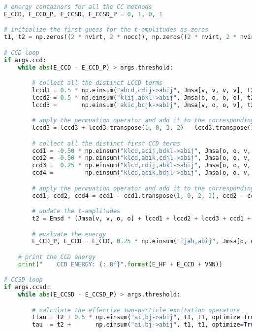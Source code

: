 \raggedbottom\begin{lstlisting}[language=Python, caption={\acrshort{ccd} and \acrshort{ccsd} method exercise code solution.}, label=code:cc_solution]
# energy containers for all the CC methods
E_CCD, E_CCD_P, E_CCSD, E_CCSD_P = 0, 1, 0, 1

# initialize the first guess for the t-amplitudes as zeros
t1, t2 = np.zeros((2 * nvirt, 2 * nocc)), np.zeros((2 * nvirt, 2 * nvirt, 2 * nocc, 2 * nocc))

# CCD loop
if args.ccd:
    while abs(E_CCD - E_CCD_P) > args.threshold:

        # collect all the distinct LCCD terms
        lccd1 = 0.5 * np.einsum("abcd,cdij->abij", Jmsa[v, v, v, v], t2, optimize=True)
        lccd2 = 0.5 * np.einsum("klij,abkl->abij", Jmsa[o, o, o, o], t2, optimize=True)
        lccd3 =       np.einsum("akic,bcjk->abij", Jmsa[v, o, o, v], t2, optimize=True)

        # apply the permuation operator and add it to the corresponding LCCD terms
        lccd3 = lccd3 + lccd3.transpose(1, 0, 3, 2) - lccd3.transpose(1, 0, 2, 3) - lccd3.transpose(0, 1, 3, 2)

        # collect all the distinct first CCD terms
        ccd1 = -0.50 * np.einsum("klcd,acij,bdkl->abij", Jmsa[o, o, v, v], t2, t2, optimize=True)
        ccd2 = -0.50 * np.einsum("klcd,abik,cdjl->abij", Jmsa[o, o, v, v], t2, t2, optimize=True)
        ccd3 =  0.25 * np.einsum("klcd,cdij,abkl->abij", Jmsa[o, o, v, v], t2, t2, optimize=True)
        ccd4 =         np.einsum("klcd,acik,bdjl->abij", Jmsa[o, o, v, v], t2, t2, optimize=True)

        # apply the permuation operator and add it to the corresponding CCD terms
        ccd1, ccd2, ccd4 = ccd1 - ccd1.transpose(1, 0, 2, 3), ccd2 - ccd2.transpose(0, 1, 3, 2), ccd4 - ccd4.transpose(0, 1, 3, 2)

        # update the t-amplitudes
        t2 = Emsd * (Jmsa[v, v, o, o] + lccd1 + lccd2 + lccd3 + ccd1 + ccd2 + ccd3 + ccd4)

        # evaluate the energy
        E_CCD_P, E_CCD = E_CCD, 0.25 * np.einsum("ijab,abij", Jmsa[o, o, v, v], t2, optimize=True)

    # print the CCD energy
    print("    CCD ENERGY: {:.8f}".format(E_HF + E_CCD + VNN))

# CCSD loop
if args.ccsd:
    while abs(E_CCSD - E_CCSD_P) > args.threshold:

        # calculate the effective two-particle excitation operators
        ttau = t2 + 0.5 * np.einsum("ai,bj->abij", t1, t1, optimize=True) - 0.5 * np.einsum("ai,bj->abij", t1, t1, optimize=True).swapaxes(2, 3)
        tau  = t2 +       np.einsum("ai,bj->abij", t1, t1, optimize=True) -       np.einsum("ai,bj->abij", t1, t1, optimize=True).swapaxes(2, 3)


\end{lstlisting}
